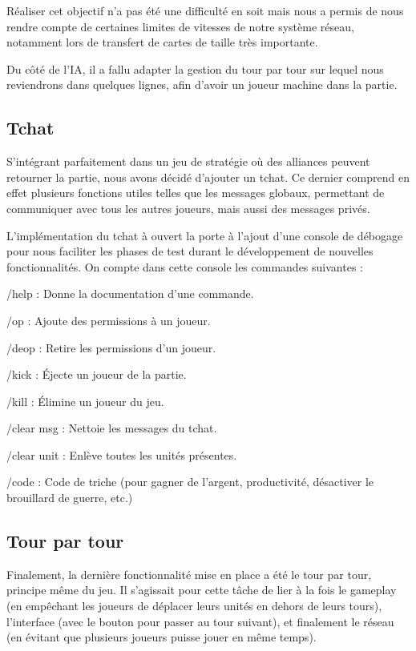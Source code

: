 \documentclass[12pt]{report}
\begin{document}
Réaliser cet objectif n’a pas été une difficulté en soit mais nous a permis de
nous rendre compte de certaines limites de vitesses de notre système réseau,
notamment lors de transfert de cartes de taille très importante.

Du côté de l’IA, il a fallu adapter la gestion du tour par tour sur lequel nous
reviendrons dans quelques lignes, afin d’avoir un joueur machine dans la partie.

\subsection{Tchat}

S’intégrant parfaitement dans un jeu de stratégie où des alliances peuvent
retourner la partie, nous avons décidé d’ajouter un tchat. Ce dernier comprend
en effet plusieurs fonctions utiles telles que les messages globaux, permettant
de communiquer avec tous les autres joueurs, mais aussi des messages privés.

L’implémentation du tchat à ouvert la porte à l’ajout d’une console de débogage
pour nous faciliter les phases de test durant le développement de nouvelles
fonctionnalités. On compte dans cette console les commandes suivantes :

/help : Donne la documentation d’une commande.

/op : Ajoute des permissions à un joueur.

/deop : Retire les permissions d’un joueur.

/kick : Éjecte un joueur de la partie.

/kill : Élimine un joueur du jeu.

/clear msg : Nettoie les messages du tchat.

/clear unit : Enlève toutes les unités présentes.

/code : Code de triche (pour gagner de l’argent, productivité, désactiver le
brouillard de guerre, etc.)

\subsection{Tour par tour}

Finalement, la dernière fonctionnalité mise en place a été le tour par tour,
principe même du jeu. Il s’agissait pour cette tâche de lier à la fois le
gameplay (en empêchant les joueurs de déplacer leurs unités en dehors de leurs
tours), l’interface (avec le bouton pour passer au tour suivant), et finalement
le réseau (en évitant que plusieurs joueurs puisse jouer en même temps).
\end{document}
